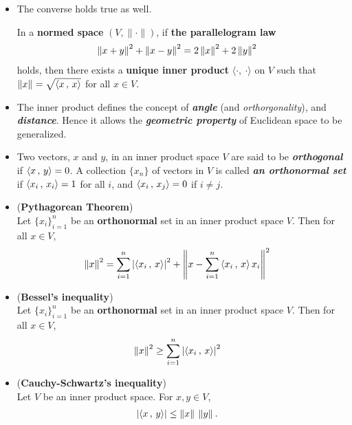 \documentclass[11pt]{article}
\begin{document}
\begin{itemize}
\item The converse holds true as well.
\begin{proposition}
In a \textbf{normed space} $(V, \|\cdot \|)$, if \textbf{the parallelogram law}
\begin{align*}
\left\|x + y\right\|_{}^2 + \left\|x- y\right\|_{}^2 &= 2 \left\|x\right\|_{}^2 + 2\left\|y\right\|_{}^2
\end{align*} holds, then there exists a \textbf{unique inner product} $\langle \cdot ,\ \cdot \rangle$ on $V$ such that $\left\|x\right\|_{} = \sqrt{\left\langle x\,,\, x \right\rangle}$ for all $x \in V$.
\end{proposition}

\item \begin{remark}
The  inner product defines the concept of \emph{\textbf{angle}} (and \emph{orthorgonality}), and \emph{\textbf{distance}}. Hence it allows the \emph{\textbf{geometric property}} of Euclidean space to be generalized.
\end{remark}


\item \begin{definition}
Two vectors, $x$ and $y$, in an inner product space $V$ are said to be \emph{\textbf{orthogonal}} if $\left\langle x\,,\, y \right\rangle = 0$. A collection $\{x_n\}$ of vectors in $V$ is called \emph{\textbf{an orthonormal set}} if $\left\langle x_i\,,\, x_i \right\rangle = 1$ for all $i$, and $\left\langle x_i\,,\, x_j \right\rangle = 0$ if $i\neq j$.
\end{definition}

\item \begin{theorem} (\textbf{Pythagorean Theorem})\\
Let $\{x_i\}_{i=1}^{n}$ be an \textbf{orthonormal} set in an inner product space $V$. Then for all $x \in V$,
\begin{align*}
\left\|x\right\|_{}^2 &= \sum_{i=1}^{n}\left\lvert \left\langle x_i\,,\, x \right\rangle \right\rvert^2 + \left\|x - \sum_{i=1}^{n}\left\langle x_i\,,\, x \right\rangle x_i\right\|_{}^2
\end{align*}
\end{theorem}

\item \begin{corollary} (\textbf{Bessel's inequality})\\
Let $\{x_i\}_{i=1}^{n}$ be an \textbf{orthonormal} set in an inner product space $V$. Then for all $x \in V$,
\begin{align*}
\left\|x\right\|_{}^2 &\ge \sum_{i=1}^{n}\left\lvert \left\langle x_i\,,\, x \right\rangle \right\rvert^2 
\end{align*}
\end{corollary}

\item \begin{corollary} (\textbf{Cauchy-Schwartz's inequality})\\
Let $V$ be an inner product space. For $x,y \in V$,
\begin{align*}
\left\lvert \left\langle x\,,\, y \right\rangle \right\rvert &\le \left\|x\right\|_{}\,\left\|y\right\|_{}.
\end{align*}
\end{corollary}
\end{itemize}
\end{document}
